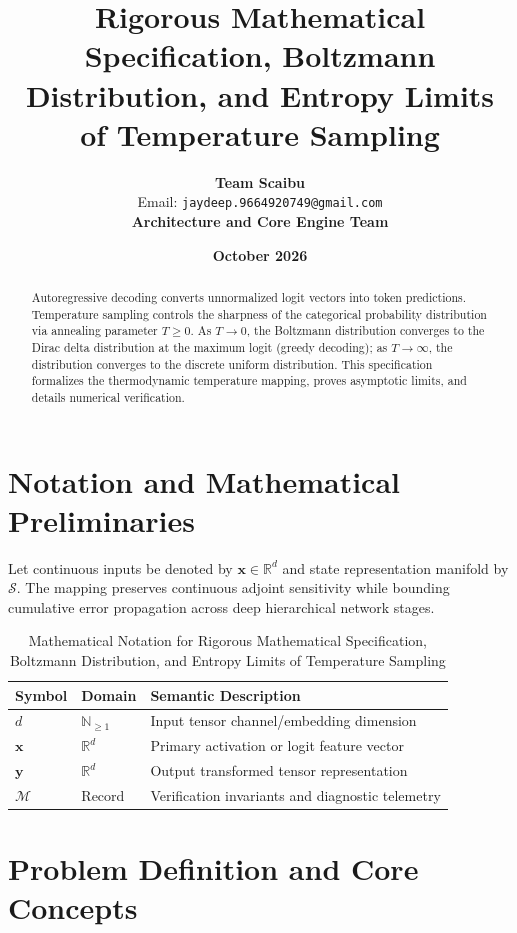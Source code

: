 \documentclass[11pt,a4paper]{article}
\title{\textbf{Rigorous Mathematical Specification, Boltzmann Distribution, and Entropy Limits of Temperature Sampling}}
\author{\textbf{Team Scaibu} \\ \small Email: \texttt{jaydeep.9664920749@gmail.com} \\ \small \textbf{Architecture and Core Engine Team}}
\date{\textbf{October 2026}}
\theoremstyle{definition}
\begin{document}
\maketitle

\begin{abstract}
Autoregressive decoding converts unnormalized logit vectors into token predictions. Temperature sampling controls the sharpness of the categorical probability distribution via annealing parameter $T \ge 0$. As $T \to 0$, the Boltzmann distribution converges to the Dirac delta distribution at the maximum logit (greedy decoding); as $T \to \infty$, the distribution converges to the discrete uniform distribution. This specification formalizes the thermodynamic temperature mapping, proves asymptotic limits, and details numerical verification.
\end{abstract}

\section{Notation and Mathematical Preliminaries}

Let continuous inputs be denoted by $\mathbf{x} \in \mathbb{R}^d$ and state representation manifold by $\mathcal{S}$. The mapping preserves continuous adjoint sensitivity while bounding cumulative error propagation across deep hierarchical network stages.

\begin{table}[h]
\centering
\caption{Mathematical Notation for Rigorous Mathematical Specification, Boltzmann Distribution, and Entropy Limits of Temperature Sampling}
\begin{tabular}{lll}
\toprule
\textbf{Symbol} & \textbf{Domain} & \textbf{Semantic Description} \\
\midrule
$d$ & $\mathbb{N}_{\ge 1}$ & Input tensor channel/embedding dimension \\
$\mathbf{x}$ & $\mathbb{R}^d$ & Primary activation or logit feature vector \\
$\mathbf{y}$ & $\mathbb{R}^d$ & Output transformed tensor representation \\
$\mathcal{M}$ & Record & Verification invariants and diagnostic telemetry \\
\bottomrule
\end{tabular}
\end{table}

\section{Problem Definition and Core Concepts}
\end{document}
